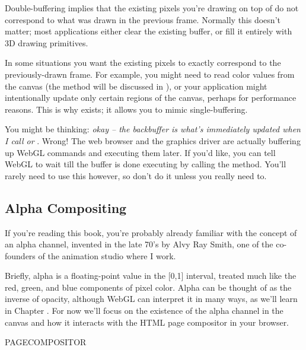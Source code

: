 Double-buffering implies that the existing pixels you're drawing on top of do not correspond to what was drawn in the previous frame.  Normally this doesn't matter; most applications either clear the existing buffer, or fill it entirely with 3D drawing primitives.

In some situations you want the existing pixels to exactly correspond to the previously-drawn frame.  For example, you might need to read color values from the canvas (the   method will be discussed in ), or your application might intentionally update only certain regions of the canvas, perhaps for performance reasons.  This is why  exists; it allows you to mimic  single-buffering.

You might be thinking: \emph{okay -- the backbuffer is what's immediately updated when I call  or }.  Wrong!  The web browser and the graphics driver are actually buffering up WebGL commands and executing them later.  If you'd like, you can tell WebGL to wait till the buffer is done executing by calling the   method.  You'll rarely need to use this however, so don't do it unless you really need to.

\subsection{Alpha Compositing}

If you're reading this book, you're probably already familiar with the concept of an alpha channel, invented in the late 70's by Alvy Ray Smith, one of the co-founders of the animation studio where I work.

Briefly, alpha is a floating-point value in the [0,1] interval, treated much like the red, green, and blue components of pixel color.  Alpha can be thought of as the inverse of opacity, although WebGL can interpret it in many ways, as we'll learn in Chapter .  For now we'll focus on the existence of the alpha channel in the canvas and how it interacts with the HTML page compositor in your browser.

PAGECOMPOSITOR

\begin{comment}
images of a web page that has a background image (Egypt!)
each canvas should have an opaque perspective cube

0,0.25,.5,.5 -- no alpha, css-opacity=1
0,0.25,.5,.5 -- alpha without premultiplied, css-opacity=1
0,0.25,.5,.5 -- alpha with premultiplied, css-opacity=1

0,0.25,.5,.5 -- no alpha, css-opacity=.5
0,0.25,.5,.5 -- alpha without premultiplied, css-opacity=.5
0,0.25,.5,.5 -- alpha with premultiplied, css-opacity=.5
\end{comment}

